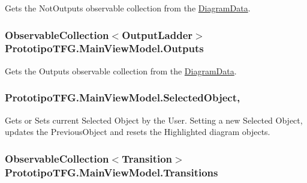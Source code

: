 Gets the Not\+Outputs observable collection from the \hyperlink{class_prototipo_t_f_g_1_1_diagram_data}{Diagram\+Data}. 

\hypertarget{class_prototipo_t_f_g_1_1_main_view_model_a4f919cf0de94a255678ff6fde07e39ed}{}
\subsubsection[{Outputs}]{\setlength{\rightskip}{0pt plus 5cm}Observable\+Collection$<${\bf Output\+Ladder}$>$ Prototipo\+T\+F\+G.\+Main\+View\+Model.\+Outputs\hspace{0.3cm}{\ttfamily [get]}}\label{class_prototipo_t_f_g_1_1_main_view_model_a4f919cf0de94a255678ff6fde07e39ed}


Gets the Outputs observable collection from the \hyperlink{class_prototipo_t_f_g_1_1_diagram_data}{Diagram\+Data}. 

\hypertarget{class_prototipo_t_f_g_1_1_main_view_model_a5af0877eee5d1a003d61a3beba45272a}{}
\subsubsection[{Selected\+Object}]{ Prototipo\+T\+F\+G.\+Main\+View\+Model.\+Selected\+Object\hspace{0.3cm}{\ttfamily [get]}, {\ttfamily [set]}}\label{class_prototipo_t_f_g_1_1_main_view_model_a5af0877eee5d1a003d61a3beba45272a}


Gets or Sets current Selected Object by the User. Setting a new Selected Object, updates the Previous\+Object and resets the Highlighted diagram objects. 

\hypertarget{class_prototipo_t_f_g_1_1_main_view_model_a4103c6effdcf319086110b26b7de146f}{}
\subsubsection[{Transitions}]{\setlength{\rightskip}{0pt plus 5cm}Observable\+Collection$<${\bf Transition}$>$ Prototipo\+T\+F\+G.\+Main\+View\+Model.\+Transitions\hspace{0.3cm}{\ttfamily [get]}}\label{class_prototipo_t_f_g_1_1_main_view_model_a4103c6effdcf319086110b26b7de146f}


